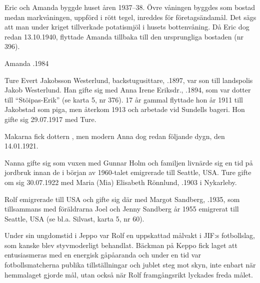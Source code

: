 Eric och Amanda byggde huset åren 1937--38. Övre våningen byggdes som bostad medan markvåningen, uppförd i rött tegel, inreddes för 	företagsändamål. Det sägs att man under kriget tillverkade potatismjöl i husets  bottenvåning. Då Eric dog redan 13.10.1940, flyttade Amanda tillbaka till den ursprungliga bostaden (nr 396).

Amanda .1984



%


%
Ture Evert Jakobsson Westerlund, backstugusittare,  .1897, var son till landspolis Jakob Westerlund. Han gifte sig med Anna Irene Eriksdr., .1894, som var dotter till ``Stöipas-Erik'' (se karta 5, nr 376). 17 år gammal flyttade hon år 1911 till Jakobstad som piga, men återkom 1913 och arbetade vid Sundells bageri. Hon gifte sig 29.07.1917 med Ture.

Makarna fick dottern , men modern Anna dog redan följande dygn, den 14.01.1921.


Nanna gifte sig som vuxen med Gunnar Holm och familjen livnärde sig en tid på jordbruk innan de i början av 1960-talet emigrerade till Seattle, USA. Ture gifte om sig 30.07.1922 med Maria (Mia) Elisabeth Rönnlund, .1903 i Nykarleby.
\begin{jhchildren}
  \item {}
  \item {}
\end{jhchildren}

Rolf emigrerade till USA och gifte sig där med Margot Sandberg, .1935, som tillsammans med föräldrarna Joel och Jenny Sandberg år 1955 emigrerat till Seattle, USA (se bl.a. Silvast, karta 5, nr 60).

Under sin ungdomstid i Jeppo var Rolf en uppskattad målvakt i JIF:s fotbollslag, som kanske blev styvmoderligt behandlat. Bäckman på  Keppo fick laget att entusiasmeras med en energisk gåpåaranda och under en tid var fotbollsmatcherna publika tillställningar och jublet steg mot skyn, inte enbart när hemmalaget gjorde mål, utan också när Rolf framgångsrikt lyckades freda målet.

